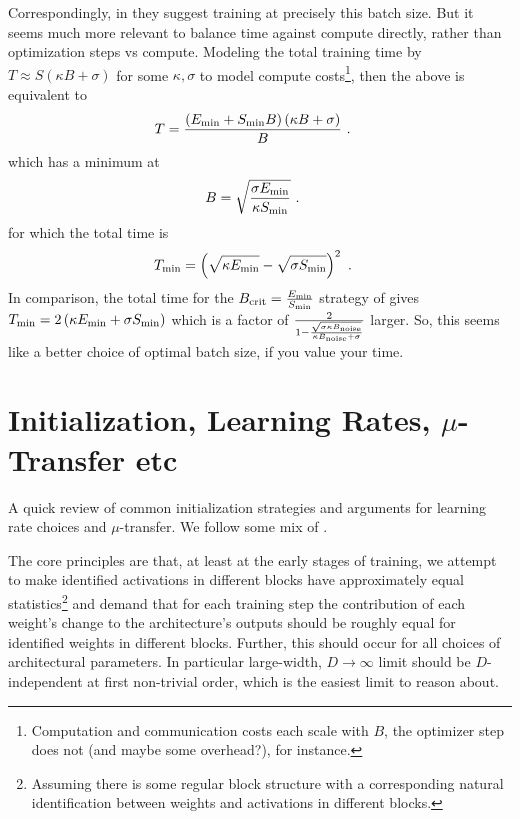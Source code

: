 \documentclass[11pt]{article}
\begin{document}
Correspondingly, in \cite{mccandlish2018empirical} they suggest training at precisely this batch
size.  But it seems much more relevant to balance time against compute directly, rather than
optimization steps vs compute. Modeling the total training time by $ T\approx S \left ( \kappa B + \sigma  \right)$
for some $ \kappa ,\sigma  $ to model compute costs\footnote{Computation and communication costs
	each scale with $ B $, the optimizer step does not (and maybe some overhead?), for instance.}, then
the above is equivalent to
\begin{align}
	T & = \frac{\left ( E _{ {\rm min} } + S _{ {\rm min} } B \right) \left ( \kappa B+ \sigma   \right ) }{  B  }\ .
\end{align}
which has a minimum at
\begin{align}
	B & = \sqrt{\frac{ \sigma E _{ {\rm min} } }{ \kappa S _{ {\rm min} }   }}\ .
\end{align}
for which the total time is
\begin{align}
	T _{ {\rm  min} } & = \left ( \sqrt{\kappa E _{ {\rm  min} }} - \sqrt{\sigma S _{ {\rm min} }} \right ) ^{ 2 }\ .
\end{align}
In comparison, the total time for the $ B _{ {\rm  crit} } = \frac{ E _{ {\rm min} } }{ S _{ {\rm
						min} } } $ strategy of \cite{mccandlish2018empirical} gives $ T _{ {\rm  min} } = 2 \left ( \kappa E
	_{ {\rm min} } + \sigma S _{ {\rm min} } \right ) $ which is a factor of $ \frac{ 2 }{ 1- \frac{
			\sqrt{\sigma \kappa B _{ {\rm noise} } } }{ \kappa B _{ {\rm noise}  } + \sigma } } $ larger.
So, this seems like a better choice of optimal batch size, if you value your time.


\section{Initialization, Learning Rates, $ \mu $-Transfer etc \label{app_init_lr_mup}}

A quick review of common initialization strategies and arguments for learning rate choices and $ \mu
$-transfer. We follow some mix of  \cite{physicalDL, yang2022tensor,
yaida2022metaprincipledfamilyhyperparameterscaling,doshi2023criticalinitializationwidedeep}.

The core principles are that, at least at the early stages of training, we attempt to make
identified activations in different blocks have approximately equal statistics\footnote{Assuming
there is some regular block structure with a corresponding natural identification between weights
and activations in different blocks.}  and demand that for each training step the contribution of
each weight's change to the architecture's outputs should be roughly equal for identified weights in
different blocks. Further, this should occur for all choices of architectural parameters. In
particular large-width, $ D \longrightarrow \infty $ limit should be $ D $-independent at first
non-trivial order, which is the easiest limit to reason about.
\end{document}
